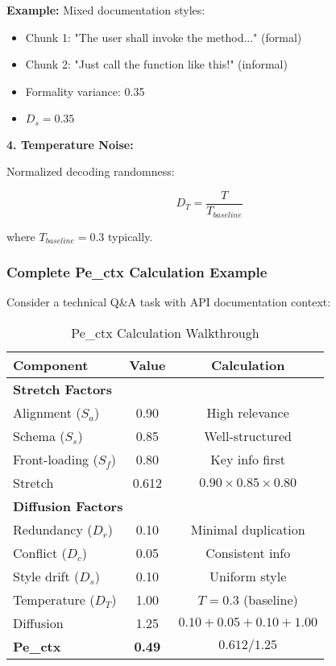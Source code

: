 \documentclass[conference]{IEEEtran}
\begin{document}
\textbf{Example:} Mixed documentation styles:
\begin{itemize}
\item Chunk 1: "The user shall invoke the method..." (formal)
\item Chunk 2: "Just call the function like this!" (informal)
\item Formality variance: 0.35
\item $D_s = 0.35$
\end{itemize}

\textbf{4. Temperature Noise:}

Normalized decoding randomness:

\begin{equation}
D_T = \frac{T}{T_{baseline}}
\end{equation}

where $T_{baseline} = 0.3$ typically.

\subsubsection{Complete Pe\_ctx Calculation Example}

Consider a technical Q\&A task with API documentation context:

\begin{table}[h]
\centering
\caption{Pe\_ctx Calculation Walkthrough}
\begin{tabular}{@{}lcc@{}}
\toprule
Component & Value & Calculation \\
\midrule
\multicolumn{3}{l}{\textbf{Stretch Factors}} \\
Alignment ($S_a$) & 0.90 & High relevance \\
Schema ($S_s$) & 0.85 & Well-structured \\
Front-loading ($S_f$) & 0.80 & Key info first \\
Stretch & 0.612 & $0.90 \times 0.85 \times 0.80$ \\
\midrule
\multicolumn{3}{l}{\textbf{Diffusion Factors}} \\
Redundancy ($D_r$) & 0.10 & Minimal duplication \\
Conflict ($D_c$) & 0.05 & Consistent info \\
Style drift ($D_s$) & 0.10 & Uniform style \\
Temperature ($D_T$) & 1.00 & $T=0.3$ (baseline) \\
Diffusion & 1.25 & $0.10 + 0.05 + 0.10 + 1.00$ \\
\midrule
\textbf{Pe\_ctx} & \textbf{0.49} & $0.612 / 1.25$ \\
\bottomrule
\end{tabular}
\end{table}
\end{document}
